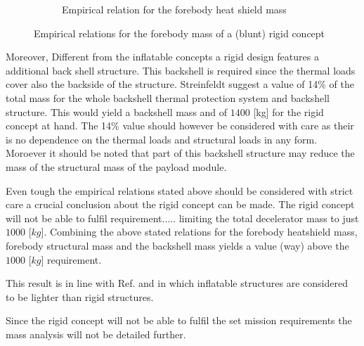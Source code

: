 \begin{figure}[h]
\begin{subfigure}[b]{0.49\textwidth}
	\caption{Empirical relation for the forebody heat shield mass} 
	\label{fig:rigidstruct}
	\end{subfigure}
	\caption{Empirical relations for the forebody mass of a (blunt) rigid concept}
	\label{fig:rigid}
\end{figure}

Moreover, Different from the inflatable concepts a rigid design features a additional back shell structure. This backshell is required since the thermal loads cover also the backside of the structure. Streinfeldt suggest a value of 14\% of the total mass for the whole backshell thermal protection system and backshell structure. This would yield a backshell mass and of $1400$ [kg] for the rigid concept at hand. The 14\% value should however be considered with care as their is no dependence on the thermal loads and structural loads in any form. Moroever it should be noted that part of this backshell structure may reduce the mass of the structural mass of the payload module.

Even tough the empirical relations stated above should be considered with strict care a crucial conclusion about the rigid concept can be made. The rigid concept will not be able to fulfil requirement..... limiting the total decelerator mass to just $1000$ [$kg$]. Combining the above stated relations for the forebody heatshield mass, forebody structural mass and the backshell mass yields a value (way) above the $1000$ [$kg$] requirement.


This result is in line with Ref. \cite{Cianciolo2010} and \cite{Cassapakis1995} in which inflatable structures are considered to be lighter than rigid structures.


Since the rigid concept will not be able to fulfil the set mission requirements the mass analysis will not be detailed further. 

 


